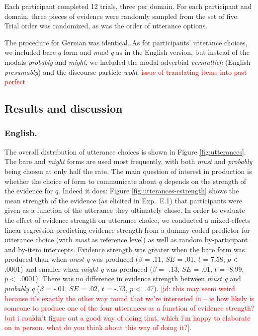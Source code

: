 \documentclass[11pt]{article}
\newcommand{\red}[1]{\textcolor{Red}{#1}}
\newcommand{\jd}[1]{\textcolor{Red}{[jd: #1]}}
\newcommand{\figref}[1]{Figure \ref{#1}}
\begin{document}
Each participant completed 12 trials, three per domain. For each participant and domain, three pieces of evidence were randomly sampled from the set of five. Trial order was randomized, as was the order of utterance options.

The procedure for German was identical. As for participants' utterance choices, we included bare $q$ form and \emph{must q} as in the English version, but instead of the modals \emph{probably} and \emph{might}, we included the modal adverbial \emph{vermutlich} (English \emph{presumably}) and the discourse particle \emph{wohl}. \red{issue of translating items into past perfect}

\subsection{Results and discussion}

\subsubsection{English.} The overall distribution of utterance choices is shown in \figref{fig:utterances}. The bare and \emph{might} forms are used most frequently, with both \emph{must} and \emph{probably} being chosen at only half the rate. The main question of interest in production is whether the choice of form to communicate about $q$ depends on the strength of the evidence for $q$. Indeed it does: \figref{fig:utterances-estrength} shows the mean strength of the evidence (as elicited in Exp.~E.1) that participants were given as a function of the utterance they ultimately chose.   In order to evaluate the effect of evidence strength on utterance choice, we conducted a mixed-effects linear regression predicting evidence strength from a dummy-coded predictor for utterance choice (with \emph{must} as reference level) as well as random by-participant and by-item  intercepts. Evidence strength was greater when the bare form was produced than when \emph{must q} was produced ($\beta$ = .11, $SE$ = .01, $t$ = 7.58, $p <$ .0001) and smaller when \emph{might q} was produced  ($\beta$ = -.13, $SE$ = .01, $t$ = -8.99, $p <$ .0001). There was no difference in evidence strength between \emph{must q} and \emph{probably q}  ($\beta$ = -.01, $SE$ = .02, $t$ = -.73, $p <$ .47). \jd{this may seem weird because it's exactly the other way round that we're interested in -- ie how likely is someone to produce one of the four utterances as a function of evidence strength? but i couldn't figure out a good way of doing that, which i'm happy to elaborate on in person. what do you think about this way of doing it?}.
\end{document}
